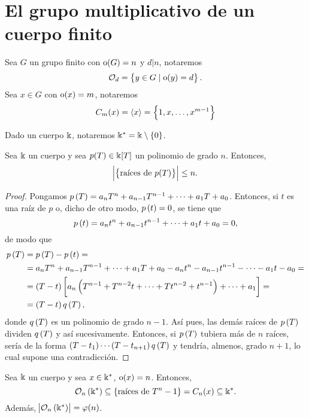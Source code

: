 \section{El grupo multiplicativo de un cuerpo finito}

\begin{obs}[Notación]
    Sea $G$ un grupo finito con $\operatorname{o}(G) = n$ y $d \vert n$, notaremos
    \[
        \mathcal{O}_d = \left\{y \in G \mid \operatorname{o}(y) = d\right\}.
    \]
    Sea $x \in G$ con $\operatorname{o}(x) = m$, notaremos
    \[
        C_m(x) = \langle x \rangle = \left\{1, x, \dots, x^{m-1}\right\}
    \]
\end{obs}

\begin{obs}[Notación]
    Dado un cuerpo $\Bbbk$, notaremos $\Bbbk^\ast = \Bbbk \setminus \left\{0\right\}$.
\end{obs}

\begin{lema}
    Sea $\Bbbk$ un cuerpo y sea $p(T) \in \Bbbk[T]$ un polinomio de grado $n$. Entonces,
    \[
        \abs{\left\{\text{raíces de } p(T)\right\}} \leq n.
    \]
\end{lema}
\begin{proof}
    Pongamos $p\left( T\right) = a_nT^n+a_{n-1}T^{n-1}+\cdots+a_1T+a_0$. Entonces, si $t$ es una raíz de $p$ o, dicho de otro modo, $p\left( t\right) = 0$, se tiene que
    \[
        p\left( t\right) = a_nt^n+a_{n-1}t^{n-1}+\cdots+a_1t+a_0=0,
    \]
    de modo que
    \begin{align*}
        p\left( T\right) &= p\left( T\right) - p\left( t\right) =\\
        &= a_nT^n+a_{n-1}T^{n-1}+\cdots+a_1T+a_0-a_nt^n-a_{n-1}t^{n-1}-\cdots-a_1t-a_0=\\
        &= \left( T-t\right)\left[ a_n\left( T^{n-1} + T^{n-2}t+ \cdots +Tt^{n-2} +t^{n-1}\right) + \cdots+ a_1\right]=\\
        &= \left( T-t\right) q\left( T\right),
    \end{align*}
    donde $q\left( T\right)$ es un polinomio de grado $n-1$. Así pues, las demás raíces de $p\left( T\right)$ dividen $q\left( T\right)$ y así sucesivamente. Entonces, si $p\left( T\right)$ tubiera más de $n$ raíces, sería de la forma $\left( T-t_1\right) \cdots \left( T-t_{n+1}\right) q\left( T\right)$ y tendría, almenos, grado $n+1$, lo cual supone una contradicción.
\end{proof}

\begin{lema}
    Sea $\Bbbk$ un cuerpo y sea $x \in \Bbbk^\ast$, $\operatorname{o}(x) = n$. Entonces,
    \[
        \mathcal{O}_n\left( \Bbbk^\ast \right) \subseteq \left\{ \text{raíces de } T^n -1\right\}
        = C_n(x) \subseteq \Bbbk^\ast.
    \]
    Además, $\abs{\mathcal{O}_n\left( \Bbbk^\ast \right)} = \varphi(n)$.
\end{lema}

